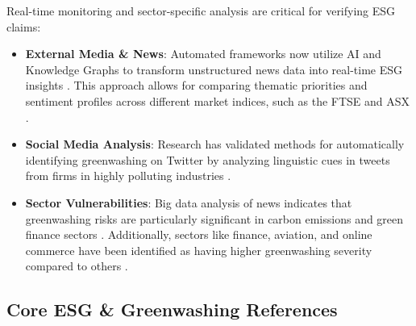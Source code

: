 \documentclass{article}
\begin{document}
Real-time monitoring and sector-specific analysis are critical for verifying ESG claims:
\begin{itemize}
\item 

\textbf{External Media \& News}: Automated frameworks now utilize AI and Knowledge Graphs to transform unstructured news data into real-time ESG insights  \parencite{omar_mohmmed_hassan_nassar_b5527512}. This approach allows for comparing thematic priorities and sentiment profiles across different market indices, such as the FTSE and ASX  \parencite{omar_mohmmed_hassan_nassar_b5527512}.\item 

\textbf{Social Media Analysis}: Research has validated methods for automatically identifying greenwashing on Twitter by analyzing linguistic cues in tweets from firms in highly polluting industries  \parencite{divinus_oppong_tawiah_f0317a5d}.\item 

\textbf{Sector Vulnerabilities}: Big data analysis of news indicates that greenwashing risks are particularly significant in carbon emissions and green finance sectors  \parencite{____fbb29d39}. Additionally, sectors like finance, aviation, and online commerce have been identified as having higher greenwashing severity compared to others  \parencite{adriana_anamaria_davidescu_cb161cbb}.
\end{itemize}


\subsection*{Core ESG \& Greenwashing References}
\end{document}
